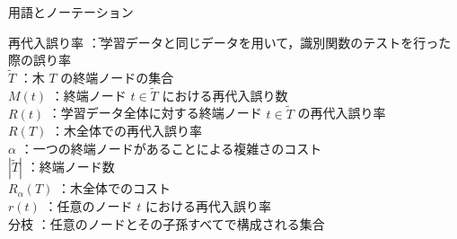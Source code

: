 \documentclass[dvipdfmx]{jreport}
\begin{document}
\begin{itembox}[l]{\large{用語とノーテーション}}
    \begin{tabbing}
        \hspace{15pt} \raisebox{0.5ex}{\tiny $\bullet$} 再代入誤り率 \=：学習データと同じデータを用いて，識別関数のテストを行った際の誤り率\\[0.5em]
        \hspace{15pt} \raisebox{0.5ex}{\tiny $\bullet$} $\tilde{T}$ \>：木 $T$ の終端ノードの集合\\[0.5em]
        \hspace{15pt} \raisebox{0.5ex}{\tiny $\bullet$} $M(t)$ \>：終端ノード $t \in \tilde{T}$ における再代入誤り数\\[0.5em]
        \hspace{15pt} \raisebox{0.5ex}{\tiny $\bullet$} $R(t)$ \>：学習データ全体に対する終端ノード $t \in \tilde{T}$ の再代入誤り率\\[0.5em]
        \hspace{15pt} \raisebox{0.5ex}{\tiny $\bullet$} $R(T)$ \>：木全体での再代入誤り率\\[0.5em]
        \hspace{15pt} \raisebox{0.5ex}{\tiny $\bullet$} $\alpha$ \>：一つの終端ノードがあることによる複雑さのコスト\\[0.5em]
        \hspace{15pt} \raisebox{0.5ex}{\tiny $\bullet$} $|\tilde{T}|$ \>：終端ノード数\\[0.5em]
        \hspace{15pt} \raisebox{0.5ex}{\tiny $\bullet$} $R_\alpha(T)$ \>：木全体でのコスト\\[0.5em]
        \hspace{15pt} \raisebox{0.5ex}{\tiny $\bullet$} $r(t)$ \>：任意のノード $t$ における再代入誤り率\\[0.5em]
        \hspace{15pt} \raisebox{0.5ex}{\tiny $\bullet$} 分枝 \>：任意のノードとその子孫すべてで構成される集合\\[0.5em]

\end{tabbing}
\end{itembox}
\end{document}
